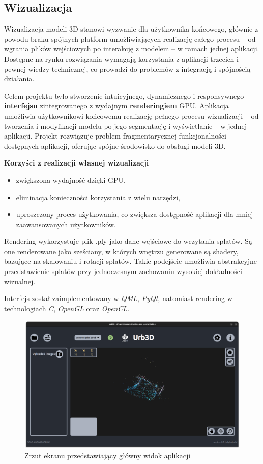 \subsection{Wizualizacja}
Wizualizacja modeli 3D stanowi wyzwanie dla użytkownika końcowego,
głównie z powodu braku spójnych platform umożliwiających realizację
całego procesu – od wgrania plików wejściowych po interakcję z modelem – w ramach jednej aplikacji.
Dostępne na rynku rozwiązania wymagają korzystania z aplikacji trzecich i pewnej wiedzy technicznej,
co prowadzi do problemów z integracją i spójnością działania.

Celem projektu było stworzenie intuicyjnego, dynamicznego i responsywnego \textbf{interfejsu} zintegrowanego z wydajnym \textbf{renderingiem} GPU.
Aplikacja umożliwia użytkownikowi końcowemu realizację pełnego procesu
wizualizacji – od tworzenia i modyfikacji modelu po jego segmentację i wyświetlanie – w jednej aplikacji.
Projekt rozwiązuje problem fragmentarycznej funkcjonalności dostępnych aplikacji, oferując spójne środowisko do obsługi modeli 3D.

\textbf{Korzyści z realizacji własnej wizualizacji}

\begin{itemize}
    \item zwiększona wydajność dzięki GPU,
    \item eliminacja konieczności korzystania z wielu narzędzi,
    \item uproszczony proces użytkowania, co zwiększa dostępność aplikacji dla mniej zaawansowanych użytkowników.
\end{itemize}

Rendering wykorzystuje plik .ply jako dane wejściowe do wczytania splatów.
Są one renderowane jako sześciany, w których wnętrzu generowane są shadery, bazujące na skalowaniu i rotacji splatów.
Takie podejście umożliwia abstrakcyjne przedstawienie splatów przy jednoczesnym zachowaniu wysokiej dokładności wizualnej.

Interfejs został zaimplementowany w \textit{QML}, \textit{PyQt}, natomiast rendering w technologiach \textit{C}, \textit{OpenGL} oraz \textit{OpenCL}.


\begin{figure}[!ht]
    \centering
    \includegraphics[width=\textwidth]{images/UI-Rendering.png}
    \caption{Zrzut ekranu przedstawiający główny widok aplikacji}
    \label{fig:ui-rendering}
\end{figure}

